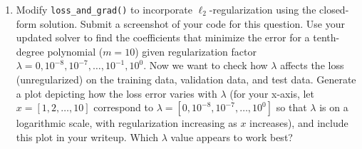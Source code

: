 \documentclass[11pt]{article}
\begin{document}
\begin{enumerate}[resume]

\item  {} Modify \verb|loss_and_grad()| to incorporate $\ell_2$-regularization using the closed-form solution. Submit a screenshot of your code for this question. 
Use your updated solver to find the coefficients that minimize the error for a tenth-degree polynomial ($m=10$) given regularization factor $\lambda = 0, 10^{-8}, 10^{-7}, \ldots, 10^{-1}, 10^{0}$. Now we want to check how $\lambda$ affects the loss (unregularized) on the training data, validation data, and test data. Generate a plot depicting how the loss error varies with $\lambda$ (for your x-axis, let $x = [1, 2, \ldots, 10]$ correspond to $\lambda = [0, 10^{-8}, 10^{-7}, \ldots, 10^{0}]$ so that $\lambda$ is on a logarithmic scale, with regularization increasing as $x$ increases), and include this plot in your writeup. Which $\lambda$ value appears to work best?

\end{enumerate}
\end{document}
